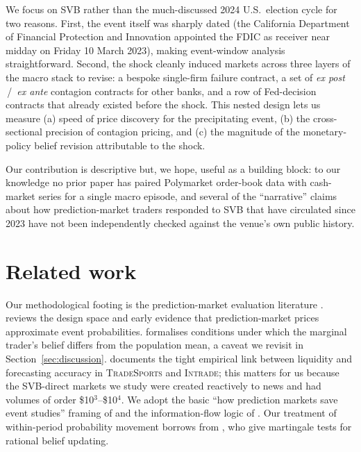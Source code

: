 \documentclass{article}
\begin{document}
We focus on SVB rather than the much-discussed 2024 U.S.\ election cycle
\citep{urquhart_2024} for two reasons.  First, the event itself was sharply
dated (the California Department of Financial Protection and Innovation
appointed the FDIC as receiver near midday on Friday 10 March 2023), making
event-window analysis straightforward.  Second, the shock cleanly induced
markets across three layers of the macro stack to revise: a bespoke
single-firm failure contract, a set of \emph{ex post} \,/\,
\emph{ex ante} contagion contracts for other banks, and a row of
Fed-decision contracts that already existed before the shock.  This nested
design lets us measure (a) speed of price discovery for the precipitating
event, (b) the cross-sectional precision of contagion pricing, and
(c) the magnitude of the monetary-policy belief revision attributable to
the shock.

Our contribution is descriptive but, we hope, useful as a building block:
to our knowledge no prior paper has paired Polymarket order-book data with
cash-market series for a single macro episode, and several of the
``narrative'' claims about how prediction-market traders responded to SVB
that have circulated since 2023 have not been independently checked
against the venue's own public history.

\section{Related work}
\label{sec:related}

Our methodological footing is the prediction-market evaluation literature
\citep{wolfers_zitzewitz_2004,berg_etal_2008,manski_2006,tetlock_2008}.
\citet{wolfers_zitzewitz_2004} reviews the design space and early
evidence that prediction-market prices approximate event probabilities.
\citet{manski_2006} formalises conditions under which the marginal trader's
belief differs from the population mean, a caveat we revisit in
Section~\ref{sec:discussion}.  \citet{tetlock_2008} documents the tight
empirical link between liquidity and forecasting accuracy in
\textsc{TradeSports} and \textsc{Intrade}; this matters for us because the
SVB-direct markets we study were created reactively to news and had
volumes of order \$10$^3$--\$10$^4$.  We adopt the basic ``how prediction
markets save event studies'' framing of
\citet{snowberg_wolfers_zitzewitz_2011} and the
information-flow logic of \citet{cowgill_wolfers_zitzewitz_2009}.  Our
treatment of within-period probability movement borrows from
\citet{augenblick_rabin_2021}, who give martingale tests for rational
belief updating.
\end{document}
